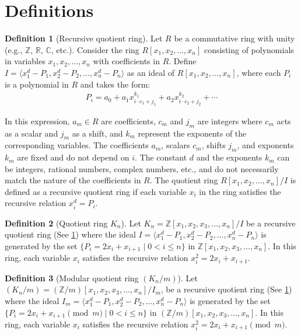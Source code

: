 \documentclass{article}
\theoremstyle{plain}
\theoremstyle{definition}
\newtheorem{definition}{Definition}
\newcommand{\Z}{\mathbb{Z}}
\newcommand{\K}{K}
\begin{document}
\section{Definitions}
\begin{definition}[Recursive quotient ring] \label{definition:recursivering}
Let \( R \) be a commutative ring with unity (e.g., \(\Z\), \(\mathbb{R}\), \(\mathbb{C}\), etc.). Consider the ring \( R[x_1, x_2, \ldots, x_n] \) consisting of polynomials in variables \( x_1, x_2, \ldots, x_n \) with coefficients in \( R \). Define \( I = \langle x_1^d - P_1, x_2^d - P_2, \ldots, x_n^d - P_n \rangle \) as an ideal of \( R[x_1, x_2, \ldots, x_n] \), where each \( P_i \) is a polynomial in \( R \) and takes the form:
\begin{align}
    P_i = a_0 + a_1 x_{i \cdot c_1 + j_1}^{k_1} + a_2 x_{i \cdot c_2 + j_2}^{k_2} + \cdots
\end{align}

In this expression, \( a_m \in R \) are coefficients, \( c_m \) and \( j_m \) are integers where \( c_m \) acts as a scalar and \( j_m \) as a shift, and \( k_m \) represent the exponents of the corresponding variables. The coefficients \( a_m \), scalars \( c_m \), shifts \( j_m \), and exponents \( k_m \) are fixed and do not depend on \( i \). The constant \( d \) and the exponents \( k_m \) can be integers, rational numbers, complex numbers, etc., and do not necessarily match the nature of the coefficients in \( R \). The quotient ring \( R[x_1, x_2, \ldots, x_n]/I \) is defined as a recursive quotient ring if each variable \( x_i \) in the ring satisfies the recursive relation \( x_i^d = P_i \).
\end{definition}

\begin{definition}[Quotient ring $\K_n$] \label{definition:ring}
Let $\K_n = \Z[x_1, x_2, x_3, \ldots, x_n]/I$ be a recursive quotient ring (See \cref{definition:recursivering}) where the ideal \( I = \langle x_1^d - P_1, x_2^d - P_2, \ldots, x_n^d - P_n \rangle \) is generated by the set $\{P_i = 2x_i + x_{i+1} \mid 0 < i \leq n \}$ in $\Z[x_1, x_2, x_3, \ldots, x_n]$. In this ring, each variable $x_i$ satisfies the recursive relation $x_i^2 = 2x_i + x_{i+1}$.
\end{definition}

\begin{definition}[Modular quotient ring $(\K_n/m)$] \label{definition:modring}
Let $(\K_n/m) = (\Z/m)[x_1, x_2, x_3, \ldots, x_n]/I_m$, be a recursive quotient ring (See \cref{definition:recursivering}) where the ideal \( I_m = \langle x_1^d - P_1, x_2^d - P_2, \ldots, x_n^d - P_n \rangle \) is generated by the set $\{P_i = 2x_i + x_{i+1} \pmod{m} \mid 0 < i \leq n \}$ in $(\Z/m)[x_1, x_2, x_3, \ldots, x_n]$. In this ring, each variable $x_i$ satisfies the recursive relation $x_i^2 = 2x_i + x_{i+1} \pmod{m}$.
\end{definition}
\end{document}
